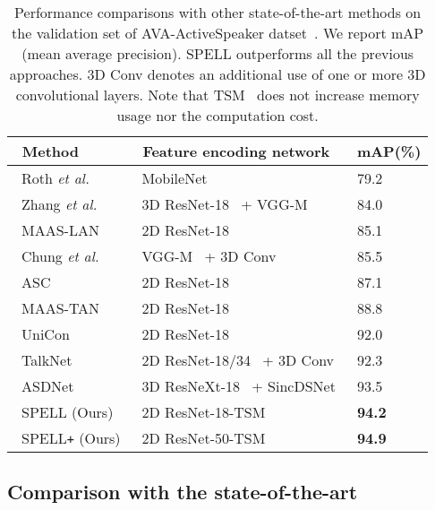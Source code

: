 \documentclass[runningheads]{llncs}
\begin{document}
\begin{table}[t]
\centering
\caption{Performance comparisons with other state-of-the-art methods on the validation set of AVA-ActiveSpeaker datset~\cite{roth2020ava}. We report mAP (mean average precision). SPELL outperforms all the previous approaches. 3D Conv denotes an additional use of one or more 3D convolutional layers. Note that TSM~\cite{lin2019tsm} does not increase memory usage nor the computation cost.}
\begin{tabular}{L{2.8cm}|L{6.0cm}|C{1.8cm}}
\toprule
\, \textbf{Method} & \, \textbf{Feature encoding network} & \textbf{mAP(\%)} \\ \midrule
\, Roth \textit{et al.}~\cite{roth2020ava} & \, MobileNet~\cite{howard2017mobilenets} & 79.2 \\
\, Zhang \textit{et al.}~\cite{zhang2019multi} & \, 3D ResNet-18~\cite{stafylakis2017combining} + VGG-M~\cite{chatfield2014return} & 84.0 \\
\, MAAS-LAN~\cite{MAAS2021} & \, 2D ResNet-18~\cite{he2016deep} & 85.1 \\
\, Chung \textit{et al.}~\cite{chung2019naver} & \, VGG-M~\cite{chatfield2014return} + 3D Conv & 85.5 \\
\, ASC~\cite{alcazarActiveSpeakersContext2020} & \, 2D ResNet-18~\cite{he2016deep} & 87.1 \\
\, MAAS-TAN~\cite{MAAS2021} & \, 2D ResNet-18~\cite{he2016deep} & 88.8 \\
\, UniCon~\cite{zhang2021unicon} & \, 2D ResNet-18~\cite{he2016deep} & 92.0 \\
\, TalkNet~\cite{tao2021someone} & \, 2D ResNet-18/34~\cite{he2016deep} + 3D Conv & 92.3 \\
\, ASDNet~\cite{ASDNet_ICCV2021} & \, 3D ResNeXt-18~\cite{kopuklu2019resource} + SincDSNet~\cite{ravanelli2018speaker} & 93.5 \\ \midrule
\, SPELL (Ours) & \, 2D ResNet-18-TSM~\cite{he2016deep,lin2019tsm} & \textbf{94.2} \\
\, SPELL\texttt{+} (Ours) & \, 2D ResNet-50-TSM~\cite{he2016deep,lin2019tsm} & \textbf{94.9} \\
\bottomrule
\end{tabular}
\label{tab:main_table}
\end{table}


\subsection{Comparison with the state-of-the-art}
\end{document}
